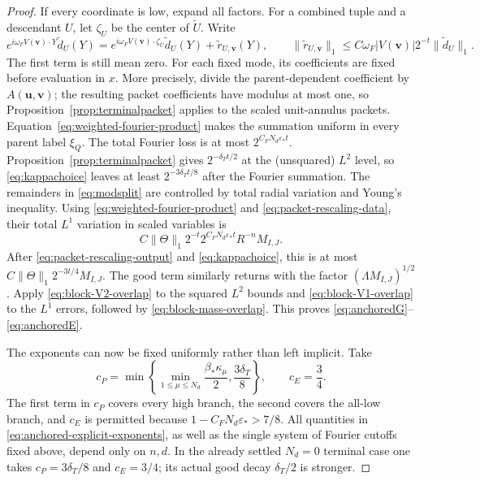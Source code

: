 \documentclass[11pt]{article}
\numberwithin{equation}{section}
\theoremstyle{remark}
\theoremstyle{definition}
\newcommand{\norm}[1]{\lVert #1\rVert}
\begin{document}
\begin{proof}
If every coordinate is low, expand all factors.  For a combined tuple and
a descendant $U$, let $\zeta_U$ be the center of $\widetilde U$.  Write
\begin{equation}\label{eq:modsplit}
 e^{i\omega_F V(\mathbf v)\cdot Y}\widetilde d_U(Y)
 =e^{i\omega_F V(\mathbf v)\cdot\zeta_U}\widetilde d_U(Y)
   +\widetilde r_{U,\mathbf v}(Y),
 \qquad
 \norm{\widetilde r_{U,\mathbf v}}_1
 \le C\omega_F|V(\mathbf v)|2^{-t}\norm{\widetilde d_U}_1.
\end{equation}
The first term is still mean zero.  For each fixed mode, its coefficients
are fixed before evaluation in $x$.  More precisely, divide the
parent-dependent coefficient by $A(\mathbf u,\mathbf v)$; the resulting
packet coefficients have modulus at most one, so
Proposition~\ref{prop:terminalpacket} applies to the scaled unit-annulus
packets.  Equation~\eqref{eq:weighted-fourier-product} makes the summation
uniform in every parent label $\xi_Q$.  The total Fourier loss is at most
$2^{C_FN_d\varepsilon_*t}$.  Proposition~\ref{prop:terminalpacket} gives
$2^{-\delta_Tt/2}$ at the (unsquared) $L^2$ level, so
\eqref{eq:kappachoice} leaves at least $2^{-3\delta_Tt/8}$ after the
Fourier summation.  The remainders in \eqref{eq:modsplit}
are controlled by total radial variation and Young's inequality.  Using
\eqref{eq:weighted-fourier-product} and
\eqref{eq:packet-rescaling-data}, their total $L^1$ variation in scaled
variables is
\[
 C\norm\Theta_1 2^{-t}2^{C_FN_d\varepsilon_*t}R^{-n}M_{I,J}.
\]
After \eqref{eq:packet-rescaling-output} and \eqref{eq:kappachoice}, this
is at most $C\norm\Theta_1 2^{-3t/4}M_{I,J}$.  The good term similarly
returns with the factor $(\Lambda M_{I,J})^{1/2}$.  Apply
\eqref{eq:block-V2-overlap} to the squared $L^2$ bounds and
\eqref{eq:block-V1-overlap} to the $L^1$ errors, followed by
\eqref{eq:block-mass-overlap}.  This proves
\eqref{eq:anchoredG}--\eqref{eq:anchoredE}.

The exponents can now be fixed uniformly rather than left implicit.  Take
\begin{equation}\label{eq:anchored-explicit-exponents}
 c_P=\min\left\{
       \min_{1\le\mu\le N_d}\frac{\beta_*\kappa_\mu}{2},
       \frac{3\delta_T}{8}\right\},
 \qquad c_E=\frac34.
\end{equation}
The first term in $c_P$ covers every high branch, the second covers the
all-low branch, and $c_E$ is permitted because
$1-C_FN_d\varepsilon_*>7/8$.  All quantities in
\eqref{eq:anchored-explicit-exponents}, as well as the single system of
Fourier cutoffs fixed above, depend only on $n,d$.  In the already settled
$N_d=0$ terminal case one takes $c_P=3\delta_T/8$ and $c_E=3/4$; its
actual good decay $\delta_T/2$ is stronger.


\end{proof}
\end{document}
